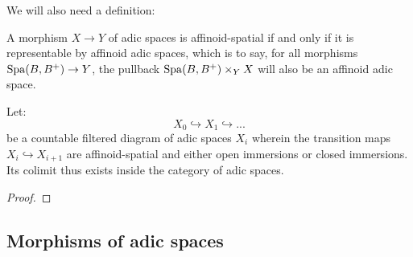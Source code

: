             We will also need a definition:
            \begin{definition} \label{def: affinoid_spatial_morphisms}
                A morphism $X \to Y$ of adic spaces is affinoid-spatial if and only if it is representable by affinoid adic spaces, which is to say, for all morphisms $\mathrm{Spa}(B, B^+) \to Y$, the pullback $\Spa(B, B^+) \x_Y X$ will also be an affinoid adic space. 
            \end{definition}
            
            \begin{proposition} \label{prop: increasing_unions_of_adic_spaces}
                Let:
                    $$X_0 \hookrightarrow X_1 \hookrightarrow ...$$
                be a countable filtered diagram of adic spaces $X_i$ wherein the transition maps $X_i \hookrightarrow X_{i + 1}$ are affinoid-spatial and either open immersions or closed immersions. Its colimit thus exists inside the category of adic spaces.
            \end{proposition}
                \begin{proof}
                    
                \end{proof}
                
    \subsection{Morphisms of adic spaces}